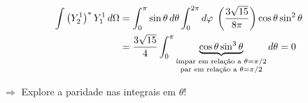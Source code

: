 \begin{align}
    \int \left(Y_2^1\right)^* Y_1^1 \, d\Omega &= \int_0^\pi \sin\theta\,d\theta \int_0^{2\pi} d\varphi \; \left( \frac{3\sqrt{15}}{8\pi} \right) \cos\theta\sin^2\theta \notag \\
    &= \frac{3\sqrt{15}}{4} \int_0^\pi \underbrace{\cos\theta \sin^3\theta}_{\substack{\text{ímpar em relação a } \theta=\pi/2 \\ \text{par em relação a } \theta=\pi/2}} d\theta = 0
\label{eq:aula20_ortogonalidade_Y21Y11}
\end{align}

$\Rightarrow$ Explore a paridade nas integrais em $\theta$!
